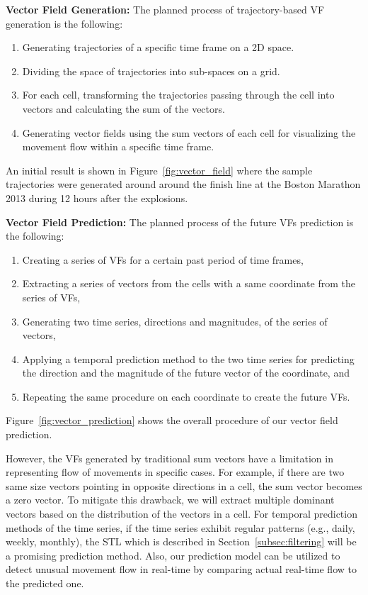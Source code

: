 \textbf{Vector Field Generation:} 
The planned process of trajectory-based VF generation is the following:
\begin{enumerate}[label={(\arabic*)}]
	\item Generating trajectories of a specific time frame on a 2D space.
	\item Dividing the space of trajectories into sub-spaces on a grid.
	\item For each cell, transforming the trajectories passing through the cell into vectors and calculating the sum of the vectors.
	\item Generating vector fields using the sum vectors of each cell for visualizing the movement flow within a specific time frame.
\end{enumerate}
An initial result is shown in Figure~\ref{fig:vector_field} where the sample trajectories were generated around around the finish line at the Boston Marathon 2013 during 12 hours after the explosions.

\textbf{Vector Field Prediction:} 
The planned process of the future VFs prediction is the following:
\begin{enumerate}[label={(\arabic*)}]
	\item Creating a series of VFs for a certain past period of time frames,
	\item Extracting a series of vectors from the cells with a same coordinate from the series of VFs,
	\item Generating two time series, directions and magnitudes, of the series of vectors,
	\item Applying a temporal prediction method to the two time series for predicting the direction and the magnitude of the future vector of the coordinate, and
	\item Repeating the same procedure on each coordinate to create the future VFs.
\end{enumerate}
Figure~\ref{fig:vector_prediction} shows the overall procedure of our vector field prediction.

However, the VFs generated by traditional sum vectors have a limitation in representing flow of movements in specific cases.
For example, if there are two same size vectors pointing in opposite directions in a cell, the sum vector becomes a zero vector.
To mitigate this drawback, we will extract multiple dominant vectors based on the distribution of the vectors in a cell.
For temporal prediction methods of the time series, if the time series exhibit regular patterns (e.g., daily, weekly, monthly), the STL which is described in Section~\ref{subsec:filtering} will be a promising prediction method.
Also, our prediction model can be utilized to detect unusual movement flow in real-time by comparing actual real-time flow to the predicted one.

